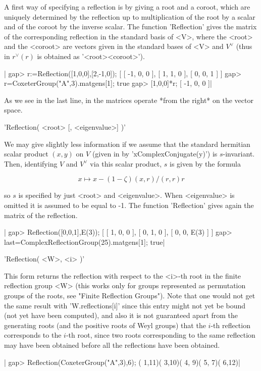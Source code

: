 A  first way of specifying  a reflection is by  giving a root and a coroot,
which are uniquely determined by the reflection up to multiplication of the
root  by a  scalar and  of the  coroot by  the inverse scalar. The function
'Reflection'  gives  the  matrix  of  the  corresponding  reflection in the
standard  basis of <V>, where the <root> and the <coroot> are vectors given
in  the standard bases of  <V> and $V^\vee$ (thus  in {\GAP} $r^\vee(r)$ is
obtained as '<root>\*<coroot>').

|    gap> r:=Reflection([1,0,0],[2,-1,0]);
    [ [ -1, 0, 0 ], [ 1, 1, 0 ], [ 0, 0, 1 ] ]
    gap> r=CoxeterGroup("A",3).matgens[1];
    true
    gap> [1,0,0]*r;
    [ -1, 0, 0 ]|

As we see in the last line, in {\GAP} the matrices operate *from the right*
on the vector space.

'Reflection( <root> [, <eigenvalue>] )'

We  may  give   slightly  less  information  if  we   assume  that  the
standard hermitian  scalar product  $(x,y)$ on $V$  (given in  {\GAP} by
'x\*ComplexConjugate(y)') is $s$-invariant.  Then, identifying  $V$ and
$V^\vee$ via this scalar product, $s$ is given by the formula

$$ x\mapsto x-(1-\zeta)(x,r)/(r,r)r$$

so  $s$ is specified by just  <root> and <eigenvalue>. When <eigenvalue> is
omitted  it is assumed to  be equal to -1.  The function 'Reflection' gives
again the matrix of the reflection.

|    gap> Reflection([0,0,1],E(3));
    [ [ 1, 0, 0 ], [ 0, 1, 0 ], [ 0, 0, E(3) ] ]
    gap> last=ComplexReflectionGroup(25).matgens[1];
    true|

'Reflection( <W>, <i> )'

This  form returns the  reflection with respect  to the <i>-th  root in the
finite  reflection group  <W> (this  works only  for groups  represented as
permutation groups of the roots, see "Finite Reflection Groups"). Note that
one  would not get the same result with 'W.reflections[i]' since this entry
might  not yet be  bound (not yet  have been computed),  and also it is not
guaranteed  apart from the generating roots (and the positive roots of Weyl
groups)  that the $i$-th  reflection corresponds to  the $i$-th root, since
two  roots  corresponding  to  the  same  reflection may have been obtained
before all the reflections have been obtained.

|    gap> Reflection(CoxeterGroup("A",3),6);
    ( 1,11)( 3,10)( 4, 9)( 5, 7)( 6,12)|

